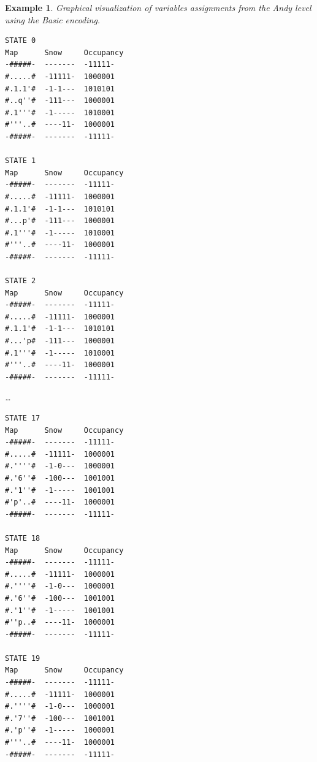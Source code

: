 \documentclass{report}
\theoremstyle{plain}
\newtheorem{example}{Example}[section]
\begin{document}
\begin{example}
\label{ex:occupancy}
Graphical visualization of variables assignments from the Andy level using the \emph{Basic encoding}. 

\vspace{1\baselineskip}

\begin{minipage}{0.4\textwidth}
\begin{center}
\begin{verbatim}
STATE 0
Map      Snow     Occupancy
-#####-  -------  -11111-
#.....#  -11111-  1000001
#.1.1'#  -1-1---  1010101
#..q''#  -111---  1000001
#.1'''#  -1-----  1010001
#'''..#  ----11-  1000001
-#####-  -------  -11111-

STATE 1
Map      Snow     Occupancy
-#####-  -------  -11111-
#.....#  -11111-  1000001
#.1.1'#  -1-1---  1010101
#...p'#  -111---  1000001
#.1'''#  -1-----  1010001
#'''..#  ----11-  1000001
-#####-  -------  -11111-

STATE 2
Map      Snow     Occupancy
-#####-  -------  -11111-
#.....#  -11111-  1000001
#.1.1'#  -1-1---  1010101
#...'p#  -111---  1000001
#.1'''#  -1-----  1010001
#'''..#  ----11-  1000001
-#####-  -------  -11111-
\end{verbatim}
\end{center}
\end{minipage}
\begin{minipage}{0.2\textwidth}
\begin{center}
\dots
\end{center}
\end{minipage}
\begin{minipage}{0.4\textwidth}
\begin{center}
\begin{verbatim}
STATE 17
Map      Snow     Occupancy
-#####-  -------  -11111-
#.....#  -11111-  1000001
#.''''#  -1-0---  1000001
#.'6''#  -100---  1001001
#.'1''#  -1-----  1001001
#'p'..#  ----11-  1000001
-#####-  -------  -11111-

STATE 18
Map      Snow     Occupancy
-#####-  -------  -11111-
#.....#  -11111-  1000001
#.''''#  -1-0---  1000001
#.'6''#  -100---  1001001
#.'1''#  -1-----  1001001
#''p..#  ----11-  1000001
-#####-  -------  -11111-

STATE 19
Map      Snow     Occupancy
-#####-  -------  -11111-
#.....#  -11111-  1000001
#.''''#  -1-0---  1000001
#.'7''#  -100---  1001001
#.'p''#  -1-----  1000001
#'''..#  ----11-  1000001
-#####-  -------  -11111-
\end{verbatim}
\end{center}
\end{minipage}


\end{example}
\end{document}
